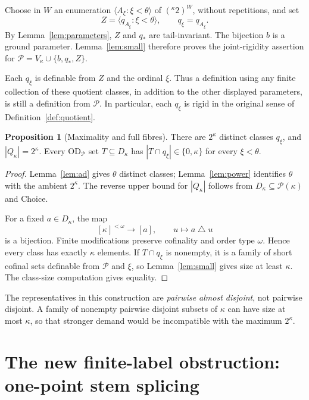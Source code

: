 \documentclass[11pt,letterpaper]{article}
\theoremstyle{definition}
\newtheorem{proposition}[definition]{Proposition}
\numberwithin{equation}{section}
\newcommand{\OD}{\mathrm{OD}}
\newcommand{\Pow}{\mathcal P}
\newcommand{\Pars}{\mathscr P}
\begin{document}
Choose in $W$ an enumeration $\langle A_\xi:\xi<\theta\rangle$ of $({}^\kappa2)^W$, without repetitions, and set
\begin{equation}\label{eq:Z}
 Z=\langle q_{A_\xi}:\xi<\theta\rangle,\qquad q_\xi=q_{A_\xi}.
\end{equation}
By Lemma~\ref{lem:parameters}, $Z$ and $q_*$ are tail-invariant. The bijection $b$ is a ground parameter. Lemma~\ref{lem:small} therefore proves the joint-rigidity assertion for $\Pars=V_\kappa\cup\{b,q_*,Z\}$.

Each $q_\xi$ is definable from $Z$ and the ordinal $\xi$. Thus a definition using any finite collection of these quotient classes, in addition to the other displayed parameters, is still a definition from $\Pars$. In particular, each $q_\xi$ is rigid in the original sense of Definition~\ref{def:quotient}.

\begin{proposition}[Maximality and full fibres]\label{prop:fibres}
There are $2^\kappa$ distinct classes $q_\xi$, and $|Q_\kappa|=2^\kappa$. Every $\OD_\Pars$ set $T\subseteq D_\kappa$ has $|T\cap q_\xi|\in\{0,\kappa\}$ for every $\xi<\theta$.
\end{proposition}
\begin{proof}
Lemma~\ref{lem:ad} gives $\theta$ distinct classes; Lemma~\ref{lem:power} identifies $\theta$ with the ambient $2^\kappa$. The reverse upper bound for $|Q_\kappa|$ follows from $D_\kappa\subseteq\Pow(\kappa)$ and Choice.

For a fixed $a\in D_\kappa$, the map
\[
 [\kappa]^{<\omega}\longrightarrow[a],\qquad u\longmapsto a\mathbin\triangle u
\]
is a bijection. Finite modifications preserve cofinality and order type $\omega$. Hence every class has exactly $\kappa$ elements. If $T\cap q_\xi$ is nonempty, it is a family of short cofinal sets definable from $\Pars$ and $\xi$, so Lemma~\ref{lem:small} gives size at least $\kappa$. The class-size computation gives equality.
\end{proof}

The representatives in this construction are \emph{pairwise almost disjoint}, not pairwise disjoint. A family of nonempty pairwise disjoint subsets of $\kappa$ can have size at most $\kappa$, so that stronger demand would be incompatible with the maximum $2^\kappa$.

\section{The new finite-label obstruction: one-point stem splicing}\label{sec:necessity}
\end{document}
